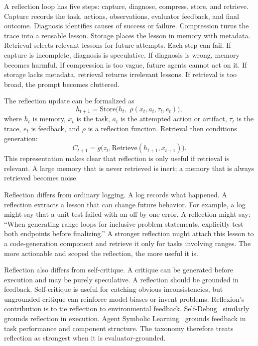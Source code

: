 A reflection loop has five steps: capture, diagnose, compress, store, and retrieve.  Capture records the task, actions, observations, evaluator feedback, and final outcome.  Diagnosis identifies causes of success or failure.  Compression turns the trace into a reusable lesson.  Storage places the lesson in memory with metadata.  Retrieval selects relevant lessons for future attempts.  Each step can fail.  If capture is incomplete, diagnosis is speculative.  If diagnosis is wrong, memory becomes harmful.  If compression is too vague, future agents cannot act on it.  If storage lacks metadata, retrieval returns irrelevant lessons.  If retrieval is too broad, the prompt becomes cluttered.

The reflection update can be formalized as
\begin{equation}
  h_{t+1} = \mathrm{Store}\bigl(h_t,\; \rho(x_t, a_t, \tau_t, e_t)\bigr),
  \label{eq:reflection-update}
\end{equation}
where $h_t$ is memory, $x_t$ is the task, $a_t$ is the attempted action or artifact, $\tau_t$ is the trace, $e_t$ is feedback, and $\rho$ is a reflection function.  Retrieval then conditions generation:
\begin{equation}
  C_{t+1} = g\bigl(z_t, \mathrm{Retrieve}(h_{t+1}, x_{t+1})\bigr).
  \label{eq:reflection-retrieval}
\end{equation}
This representation makes clear that reflection is only useful if retrieval is relevant.  A large memory that is never retrieved is inert; a memory that is always retrieved becomes noise.

Reflection differs from ordinary logging.  A log records what happened.  A reflection extracts a lesson that can change future behavior.  For example, a log might say that a unit test failed with an off-by-one error.  A reflection might say: ``When generating range loops for inclusive problem statements, explicitly test both endpoints before finalizing.''  A stronger reflection might attach this lesson to a code-generation component and retrieve it only for tasks involving ranges.  The more actionable and scoped the reflection, the more useful it is.

Reflection also differs from self-critique.  A critique can be generated before execution and may be purely speculative.  A reflection should be grounded in feedback.  Self-critique is useful for catching obvious inconsistencies, but ungrounded critique can reinforce model biases or invent problems.  Reflexion's~\cite{reflexion2023} contribution is to tie reflection to environmental feedback.  Self-Debug~\cite{singh2023selfdebug} similarly grounds reflection in execution.  Agent Symbolic Learning~\cite{agentsymboliclearning2024} grounds feedback in task performance and component structure.  The taxonomy therefore treats reflection as strongest when it is evaluator-grounded.

